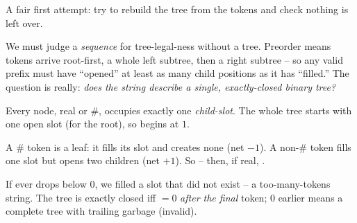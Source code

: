 \begin{attemptgate}
A fair first attempt: try to rebuild the tree from the tokens and check nothing is left
over.
\end{attemptgate}

We must judge a \emph{sequence} for tree-legal-ness without a tree. Preorder means
tokens arrive root-first, a whole left subtree, then a right subtree -- so any valid
prefix must have ``opened'' at least as many child positions as it has ``filled.'' The
question is really: \emph{does the string describe a single, exactly-closed binary tree?}

\begin{observation}
Every node, real or \#, occupies exactly one \emph{child-slot}. The whole tree starts
with one open slot (for the root), so  begins at $1$.
\end{observation}
\begin{observation}
A \# token is a leaf: it fills its slot and creates none (net $-1$). A non-\# token fills
one slot but opens two children (net $+1$). So -- then, if real, .
\end{observation}
\begin{observation}
If  ever drops below $0$, we filled a slot that did not exist -- a
too-many-tokens string. The tree is exactly closed iff $=0$ \emph{after the
final} token; $0$ earlier means a complete tree with trailing garbage (invalid).
\end{observation}

